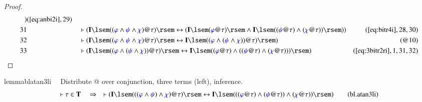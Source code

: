 \begin{proof}
\begin{align}
      )&(\mbox{\ref{eq:anbi2i}},29)\notag
  \\ 31 &&  & \vdash ( \mathbf{I} \lsem ( ( \mw{\varphi} \wedge \mw{\psi}
      \wedge \mw{\chi} ) @ \tau ) \rsem \leftrightarrow (
      \mathbf{I} \lsem ( \mw{\varphi} @ \tau ) \rsem \wedge
      \mathbf{I} \lsem ( ( \mw{\psi} @ \tau ) \wedge (
      \mw{\chi} @ \tau ) ) \rsem )
      )&(\mbox{\ref{eq:bitr4i}},28,30)\notag
  \\ 32 &&  & \vdash ( \mathbf{I} \lsem ( ( \mw{\varphi} \wedge \mw{\psi}
      \wedge \mw{\chi} ) @ \tau ) \rsem \leftrightarrow
      \mathbf{I} \lsem ( ( \mw{\varphi} \wedge ( \mw{\psi}
      \wedge \mw{\chi} ) ) @ \tau ) \rsem )&(@10)\notag
  \\ 33 &&  & \vdash ( \mathbf{I} \lsem ( ( \mw{\varphi} \wedge ( \mw{\psi}
      \wedge \mw{\chi} ) ) @ \tau ) \rsem \leftrightarrow
      \mathbf{I} \lsem ( ( \mw{\varphi} @ \tau ) \wedge ( (
      \mw{\psi} @ \tau ) \wedge ( \mw{\chi} @ \tau ) ) )
      \rsem )&(\mbox{\ref{eq:3bitr2ri}},1,31,32)\notag
\end{align}
\end{proof}

\begin{restatable}{lemma}{blatan3li}~~ Distribute @ over conjunction, three
terms (left), inference.
\begin{align}
\vdash \tau \in \mathbf{T}\quad\Rightarrow\quad \vdash ( \mathbf{I} \lsem ( ( (
    \mw{\varphi} \wedge \mw{\psi} ) \wedge \mw{\chi} ) @ \tau ) \rsem
    \leftrightarrow \mathbf{I} \lsem ( ( ( \mw{\varphi} @ \tau ) \wedge (
    \mw{\psi} @ \tau ) ) \wedge ( \mw{\chi} @ \tau ) ) \rsem
    )\label{eq:bl.atan3li}\tag{bl.atan3li}
\end{align}
\end{restatable}


